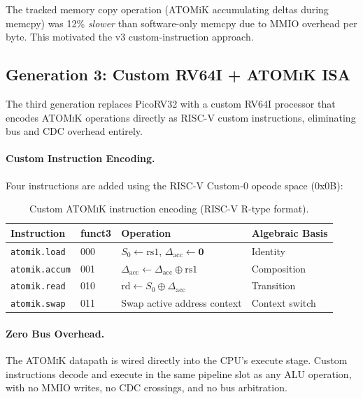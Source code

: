 \documentclass[11pt,letterpaper]{article}
\theoremstyle{plain}
\theoremstyle{definition}
\theoremstyle{remark}
\newcommand{\dcompose}{\oplus}
\newcommand{\dzero}{\mathbf{0}}
\newcommand{\atomik}{\textsc{ATOMiK}}
\begin{document}
The tracked memory copy operation (ATOMiK accumulating deltas during memcpy) was 12\% \emph{slower} than software-only memcpy due to MMIO overhead per byte. This motivated the v3 custom-instruction approach.

\subsection{Generation 3: Custom RV64I + \atomik{} ISA}
\label{sec:v3overview}

The third generation replaces PicoRV32 with a custom RV64I processor that encodes \atomik{} operations directly as RISC-V custom instructions, eliminating bus and CDC overhead entirely.

\paragraph{Custom Instruction Encoding.} Four instructions are added using the RISC-V Custom-0 opcode space (0x0B):

\begin{table}[!htbp]
\centering
\caption{Custom \atomik{} instruction encoding (RISC-V R-type format).}
\label{tab:encoding}
\begin{tabular}{@{}llll@{}}
\toprule
\textbf{Instruction} & \textbf{funct3} & \textbf{Operation} & \textbf{Algebraic Basis} \\
\midrule
\texttt{atomik.load}  & 000 & $S_0 \leftarrow \text{rs1}$, $\Delta_{\text{acc}} \leftarrow \dzero$ & Identity \\
\texttt{atomik.accum} & 001 & $\Delta_{\text{acc}} \leftarrow \Delta_{\text{acc}} \dcompose \text{rs1}$ & Composition \\
\texttt{atomik.read}  & 010 & $\text{rd} \leftarrow S_0 \oplus \Delta_{\text{acc}}$ & Transition \\
\texttt{atomik.swap}  & 011 & Swap active address context & Context switch \\
\bottomrule
\end{tabular}
\end{table}

\paragraph{Zero Bus Overhead.} The \atomik{} datapath is wired directly into the CPU's execute stage. Custom instructions decode and execute in the same pipeline slot as any ALU operation, with no MMIO writes, no CDC crossings, and no bus arbitration.
\end{document}
